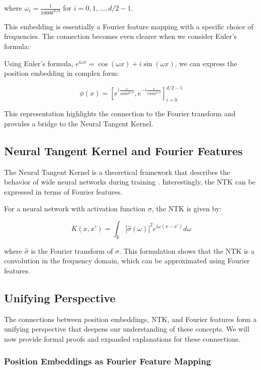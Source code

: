\documentclass{article}
\begin{document}
where $\omega_i = \frac{1}{10000^{2i/d}}$ for $i = 0, 1, ..., d/2 - 1$.

This embedding is essentially a Fourier feature mapping with a specific choice of frequencies. The connection becomes even clearer when we consider Euler's formula:

Using Euler's formula, $e^{i\omega x} = \cos(\omega x) + i\sin(\omega x)$, we can express the position embedding in complex form:

\begin{equation}
    \phi(x) = \left[e^{i\frac{x}{10000^{2i/d}}}, e^{-i\frac{x}{10000^{2i/d}}}\right]_{i=0}^{d/2-1}
\end{equation}

This representation highlights the connection to the Fourier transform and provides a bridge to the Neural Tangent Kernel.

\subsection{Neural Tangent Kernel and Fourier Features}

The Neural Tangent Kernel is a theoretical framework that describes the behavior of wide neural networks during training \citep{Jacot2018}. Interestingly, the NTK can be expressed in terms of Fourier features.

For a neural network with activation function $\sigma$, the NTK is given by:

\begin{equation}
    K(x, x') = \int_{\mathbb{R}} |\hat{\sigma}(\omega)|^2 e^{i\omega(x-x')} d\omega
\end{equation}

where $\hat{\sigma}$ is the Fourier transform of $\sigma$. This formulation shows that the NTK is a convolution in the frequency domain, which can be approximated using Fourier features.

\subsection{Unifying Perspective}

The connections between position embeddings, NTK, and Fourier features form a unifying perspective that deepens our understanding of these concepts. We will now provide formal proofs and expanded explanations for these connections.

\subsubsection{Position Embeddings as Fourier Feature Mapping}
\end{document}
